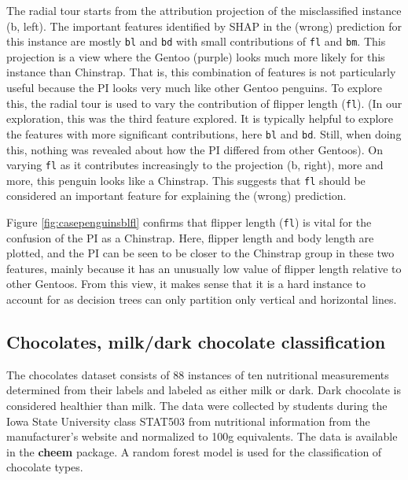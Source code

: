 \documentclass[
]{article}
\begin{document}
The radial tour starts from the attribution projection of the misclassified instance (b, left). The important features identified by SHAP in the (wrong) prediction for this instance are mostly \texttt{bl} and \texttt{bd} with small contributions of \texttt{fl} and \texttt{bm}. This projection is a view where the Gentoo (purple) looks much more likely for this instance than Chinstrap. That is, this combination of features is not particularly useful because the PI looks very much like other Gentoo penguins. To explore this, the radial tour is used to vary the contribution of flipper length (\texttt{fl}). (In our exploration, this was the third feature explored. It is typically helpful to explore the features with more significant contributions, here \texttt{bl} and \texttt{bd}. Still, when doing this, nothing was revealed about how the PI differed from other Gentoos). On varying \texttt{fl} as it contributes increasingly to the projection (b, right), more and more, this penguin looks like a Chinstrap. This suggests that \texttt{fl} should be considered an important feature for explaining the (wrong) prediction.

Figure \ref{fig:casepenguinsblfl} confirms that flipper length (\texttt{fl}) is vital for the confusion of the PI as a Chinstrap. Here, flipper length and body length are plotted, and the PI can be seen to be closer to the Chinstrap group in these two features, mainly because it has an unusually low value of flipper length relative to other Gentoos. From this view, it makes sense that it is a hard instance to account for as decision trees can only partition only vertical and horizontal lines.

\hypertarget{chocolates-milkdark-chocolate-classification}{%
\subsection{Chocolates, milk/dark chocolate classification}\label{chocolates-milkdark-chocolate-classification}}

The chocolates dataset consists of 88 instances of ten nutritional measurements determined from their labels and labeled as either milk or dark. Dark chocolate is considered healthier than milk. The data were collected by students during the Iowa State University class STAT503 from nutritional information from the manufacturer's website and normalized to 100g equivalents. The data is available in the \textbf{cheem} package. A random forest model is used for the classification of chocolate types.
\end{document}
